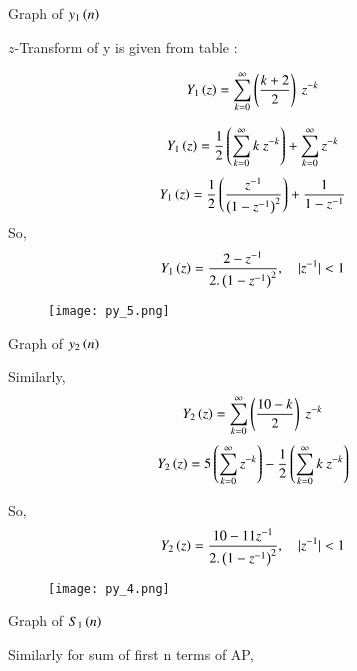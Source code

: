 \documentclass[beamer]{IEEEtran}
\theoremstyle{remark}
\begin{document}
\begin{center}
    Graph of $y_1\left(n\right)$
\end{center}

$z$-Transform of y is given from table :

\begin{align}
Y_1\left(z\right)&=\sum_{k=0}^{\infty} \left(\frac{k+2}{2}\right)\ z^{-k}
\end{align}

\begin{align}
    \label{q13}
    Y_1\brak{z}&=\frac{1}{2}\brak{\sum_{k=0}^{\infty}k\ z^{-k}}+\sum_{k=0}^{\infty}z^{-k}
\end{align}
\begin{align}
    \label{q13}
    Y_1\left(z\right)&=\frac{1}{2}\left(\frac{z^{-1}}{\left(1-z^{-1}\right)^2}\right)+\frac{1}{1-z^{-1}}
\end{align}
So,
\begin{align} Y_1\left(z\right)&=\frac{2-z^{-1}}{2.\left(1-z^{-1}\right)^2},\quad |z^{-1}|<1\end{align}

\begin{figure}[h]
    \centering
    \texttt{[image: py\_5.png]}
    \label{fig:x2n}
\end{figure}

\begin{center}
    Graph of $y_2\left(n\right) $
\end{center}

Similarly,
\begin{align}Y_2\left(z\right)&=\sum_{k=0}^{\infty} \left(\frac{10-k}{2}\right)\ z^{-k}\end{align}
\begin{align}Y_2\brak{z}&=5\brak{\sum_{k=0}^{\infty}z^{-k}}-\frac{1}{2}\brak{\sum_{k=0}^{\infty}k\ z^{-k}}\end{align}

So,
\begin{align}Y_2\left(z\right)&=\frac{10-11z^{-1}}{2.\left(1-z^{-1}\right)^2},\quad |z^{-1}|<1 \end{align}

\begin{figure}[h]
    \centering
    \texttt{[image: py\_4.png]}
    \label{fig:s1n}
\end{figure}

\begin{center}
    Graph of $S_1\left(n\right)$
\end{center}

Similarly for sum of first n terms of AP,
\end{document}
